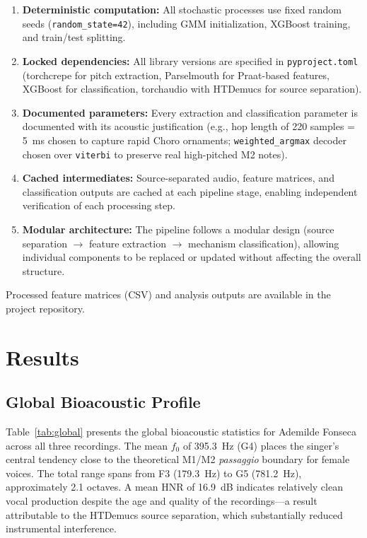 \documentclass[review,3p,number]{elsarticle}
\begin{document}
\begin{enumerate}
  \item \textbf{Deterministic computation:} All stochastic processes use fixed random
    seeds (\texttt{random\_state=42}), including GMM initialization, XGBoost training,
    and train/test splitting.
  \item \textbf{Locked dependencies:} All library versions are specified in
    \texttt{pyproject.toml} (torchcrepe for pitch extraction, Parselmouth for
    Praat-based features, XGBoost for classification, torchaudio with HTDemucs for
    source separation).
  \item \textbf{Documented parameters:} Every extraction and classification parameter
    is documented with its acoustic justification (e.g., hop length of 220 samples =
    5~ms chosen to capture rapid Choro ornaments; \texttt{weighted\_argmax} decoder
    chosen over \texttt{viterbi} to preserve real high-pitched M2 notes).
  \item \textbf{Cached intermediates:} Source-separated audio, feature matrices, and
    classification outputs are cached at each pipeline stage, enabling independent
    verification of each processing step.
  \item \textbf{Modular architecture:} The pipeline follows a modular design (source
    separation $\rightarrow$ feature extraction $\rightarrow$ mechanism
    classification), allowing individual components to be replaced or updated
    without affecting the overall structure.
\end{enumerate}

Processed feature matrices (CSV) and analysis outputs are available in the project
repository.

\section{Results}
\label{sec:results}

\subsection{Global Bioacoustic Profile}
\label{sec:global_profile}

Table~\ref{tab:global} presents the global bioacoustic statistics for Ademilde
Fonseca across all three recordings. The mean $f_0$ of 395.3~Hz (G4) places the
singer's central tendency close to the theoretical M1/M2 \emph{passaggio}
boundary for female voices. The total range spans from F3 (179.3~Hz) to G5
(781.2~Hz), approximately 2.1 octaves. A mean HNR of 16.9~dB indicates relatively
clean vocal production despite the age and quality of the recordings---a result
attributable to the HTDemucs source separation, which substantially reduced
instrumental interference.
\end{document}
